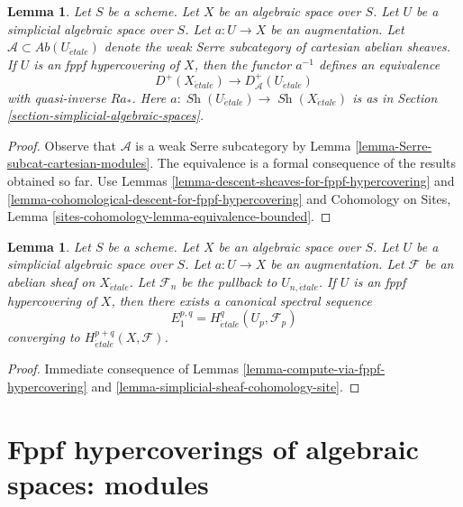 \documentclass{stacks-project}
\theoremstyle{plain}
\newtheorem{lemma}[subsection]{Lemma}
\theoremstyle{definition}
\theoremstyle{remark}
\numberwithin{equation}{subsection}
\def\Sh{\mathop{\mathit{Sh}}\nolimits}
\def\etale{{\acute{e}tale}}
\begin{document}
\begin{lemma}
\label{lemma-fppf-hypercovering-equivalence-bounded}
Let $S$ be a scheme. Let $X$ be an algebraic space over $S$.
Let $U$ be a simplicial algebraic space over $S$. Let $a : U \to X$
be an augmentation.
Let $\mathcal{A} \subset \textit{Ab}(U_\etale)$
denote the weak Serre subcategory of cartesian abelian sheaves.
If $U$ is an fppf hypercovering of $X$, then
the functor $a^{-1}$ defines an equivalence
$$
D^+(X_\etale) \longrightarrow D_\mathcal{A}^+(U_\etale)
$$
with quasi-inverse $Ra_*$. Here $a : \Sh(U_\etale) \to \Sh(X_\etale)$
is as in Section \ref{section-simplicial-algebraic-spaces}.
\end{lemma}

\begin{proof}
Observe that $\mathcal{A}$ is a weak Serre subcategory by
Lemma \ref{lemma-Serre-subcat-cartesian-modules}.
The equivalence is a
formal consequence of the results obtained so far. Use
Lemmas \ref{lemma-descent-sheaves-for-fppf-hypercovering} and
\ref{lemma-cohomological-descent-for-fppf-hypercovering} and
Cohomology on Sites, Lemma \ref{sites-cohomology-lemma-equivalence-bounded}.
\end{proof}

\begin{lemma}
\label{lemma-spectral-sequence-fppf-hypercovering}
Let $S$ be a scheme. Let $X$ be an algebraic space over $S$.
Let $U$ be a simplicial algebraic space over $S$. Let $a : U \to X$
be an augmentation. Let $\mathcal{F}$ be an abelian sheaf
on $X_\etale$. Let $\mathcal{F}_n$ be the pullback to $U_{n, \etale}$.
If $U$ is an fppf hypercovering of $X$, then
there exists a canonical spectral sequence
$$
E_1^{p, q} = H^q_\etale(U_p, \mathcal{F}_p)
$$
converging to $H^{p + q}_\etale(X, \mathcal{F})$.
\end{lemma}

\begin{proof}
Immediate consequence of Lemmas \ref{lemma-compute-via-fppf-hypercovering}
and \ref{lemma-simplicial-sheaf-cohomology-site}.
\end{proof}








\section{Fppf hypercoverings of algebraic spaces: modules}
\label{section-fppf-hypercovering-modules}
\end{document}

